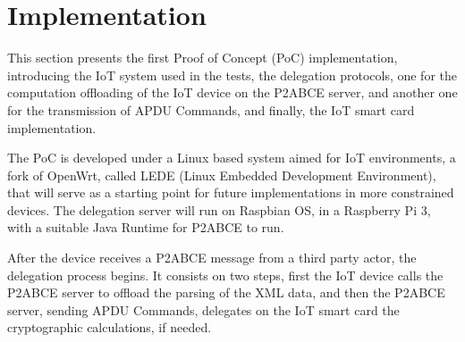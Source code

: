\section{Implementation}\label{ch:implementation}
%
%  


This section presents the first Proof of Concept (PoC) implementation, introducing the IoT system used in the tests, the delegation protocols, one for the computation offloading of the IoT device on the P2ABCE server, and another one for the transmission of APDU Commands, and finally, the IoT smart card implementation.

The PoC is developed under a Linux based system aimed for IoT environments, a fork of OpenWrt, called LEDE (Linux Embedded Development Environment), that will serve as a starting point for future implementations in more constrained devices. 
The delegation server will run on Raspbian OS, in a Raspberry Pi 3, with a suitable Java Runtime for P2ABCE to run.





After the device receives a P2ABCE message from a third party actor, the delegation process begins. It consists on two steps, first the IoT device calls the P2ABCE server to offload the parsing of the XML data, and then the P2ABCE server, sending APDU Commands, delegates on the IoT smart card the cryptographic calculations, if needed.


